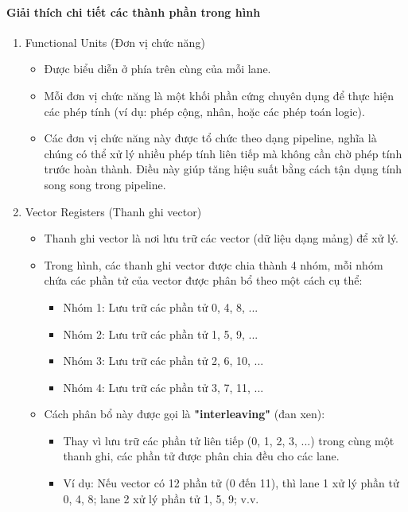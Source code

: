 \documentclass[a4paper]{article}
\begin{document}
\paragraph{Giải thích chi tiết các thành phần trong hình}
\begin{enumerate}
    \item Functional Units (Đơn vị chức năng)
    \begin{itemize}
        \item Được biểu diễn ở phía trên cùng của mỗi lane.
        \item Mỗi đơn vị chức năng là một khối phần cứng chuyên dụng để thực hiện các phép tính (ví dụ: phép cộng, nhân, hoặc các phép toán logic).
        \item Các đơn vị chức năng này được tổ chức theo dạng pipeline, nghĩa là chúng có thể xử lý nhiều phép tính liên tiếp mà không cần chờ phép tính trước hoàn thành. Điều này giúp tăng hiệu suất bằng cách tận dụng tính song song trong pipeline.
    \end{itemize}
    \item Vector Registers (Thanh ghi vector)
    \begin{itemize}
        \item Thanh ghi vector là nơi lưu trữ các vector (dữ liệu dạng mảng) để xử lý.
        \item Trong hình, các thanh ghi vector được chia thành 4 nhóm, mỗi nhóm chứa các phần tử của vector được phân bổ theo một cách cụ thể:
        \begin{itemize}
            \item Nhóm 1: Lưu trữ các phần tử 0, 4, 8, ...
            \item Nhóm 2: Lưu trữ các phần tử 1, 5, 9, ...
            \item Nhóm 3: Lưu trữ các phần tử 2, 6, 10, ...
            \item Nhóm 4: Lưu trữ các phần tử 3, 7, 11, ...
        \end{itemize}
        \item Cách phân bổ này được gọi là \textbf{"interleaving"} (đan xen):
        \begin{itemize}
            \item Thay vì lưu trữ các phần tử liên tiếp (0, 1, 2, 3, ...) trong cùng một thanh ghi, các phần tử được phân chia đều cho các lane.
            \item Ví dụ: Nếu vector có 12 phần tử (0 đến 11), thì lane 1 xử lý phần tử 0, 4, 8; lane 2 xử lý phần tử 1, 5, 9; v.v.
        \end{itemize}

\end{itemize}
\end{enumerate}
\end{document}

